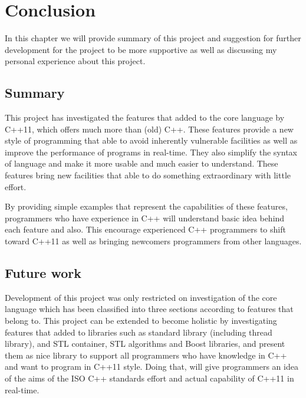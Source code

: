 \documentclass[11pt]{report}
\begin{document}
\chapter{Conclusion}
\label{chapter: conclusion}
In this chapter we will provide summary of this project and suggestion for further development for the project to be more supportive as well as discussing my personal experience about this project.
\section{Summary}
\label{se : summary}
This project has investigated the features that added to the core language by C++11, which offers much more than (old) C++. These features provide a new style of programming that able to avoid inherently vulnerable facilities as well as improve the performance of programs in real-time. They also simplify the syntax of language and make it more usable and much easier to understand. These features bring new facilities that able to do something extraordinary with little effort.

By providing simple examples that represent the capabilities of these features, programmers who have experience in C++ will understand basic idea behind each feature and also. This encourage experienced C++ programmers to shift toward C++11 as well as bringing newcomers programmers from other languages.

\section{Future work}
\label{sec: future work}
Development of this project was only restricted on investigation of the core language which has been classified into three sections according to features that belong to. This project can be extended to become holistic by investigating features that added to libraries such as standard library (including thread library), and STL container, STL algorithms and Boost libraries, and present them as nice library to support all programmers who have knowledge in C++ and want to program in C++11 style. Doing that, will give programmers an idea of the aims of the ISO C++ standards effort and actual capability of C++11 in real-time.
\end{document}
